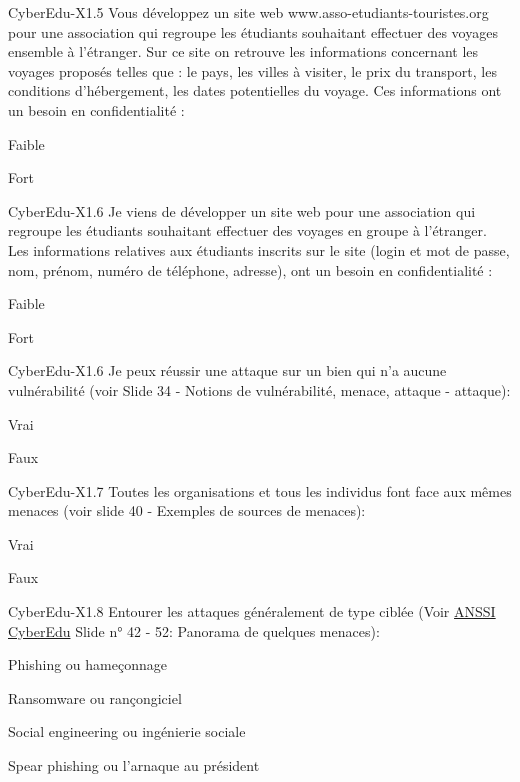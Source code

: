 \begin{multi}[multiple=true]{CyberEdu-X1.5}
	Vous développez un site web www.asso-etudiants-touristes.org  pour une association qui regroupe les étudiants souhaitant effectuer des voyages ensemble à l'étranger. Sur ce site on retrouve les informations concernant les voyages proposés telles que : le pays, les villes à visiter, le prix du transport, les conditions d'hébergement, les dates potentielles du voyage. Ces informations ont un besoin en confidentialité :
\item* 	Faible
\item 	Fort
\end{multi}

\begin{multi}[multiple=true]{CyberEdu-X1.6}
	Je viens de développer un site web pour une association qui regroupe les étudiants souhaitant effectuer des voyages en groupe à l'étranger. Les informations relatives aux étudiants inscrits sur le site (login et mot de passe, nom, prénom, numéro de téléphone, adresse), ont un besoin en confidentialité :
\item 	Faible
\item* 	Fort
\end{multi}

\begin{multi}[multiple=true]{CyberEdu-X1.6}
	Je peux réussir une attaque sur un bien qui n'a aucune vulnérabilité (voir Slide 34 - Notions de vulnérabilité, menace, attaque - attaque):
\item 	Vrai
\item* 	Faux
\end{multi}

\begin{multi}[multiple=true]{CyberEdu-X1.7}
	Toutes les organisations et tous les individus font face aux mêmes menaces (voir slide 40 - Exemples de sources de menaces):
\item 	Vrai
\item* 	Faux
\end{multi}

\begin{multi}[multiple=true]{CyberEdu-X1.8}
	Entourer les attaques généralement de type  ciblée (Voir \href{https://www.ssi.gouv.fr/administration/formations/cyberedu/contenu-pedagogique-cyberedu/}{ANSSI CyberEdu} Slide n° 42 - 52: Panorama de quelques menaces):
\item 	Phishing ou hameçonnage
\item 	Ransomware ou rançongiciel
\item* 	Social engineering ou ingénierie sociale
\item* 	Spear phishing ou l'arnaque au président
\end{multi}

